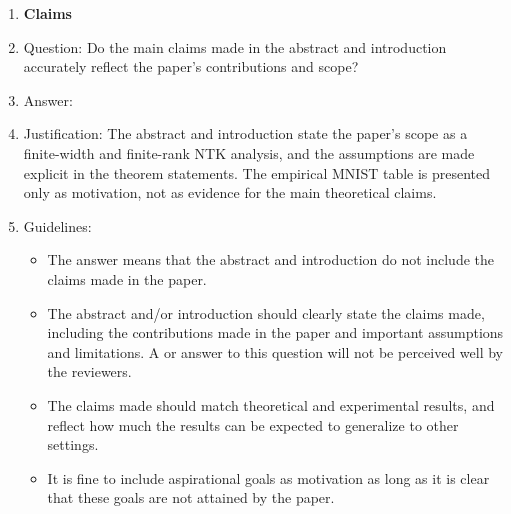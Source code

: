 \documentclass{article}
\begin{document}
\begin{enumerate}[leftmargin=1.5em]

\item {\bf Claims}
    \item[] Question: Do the main claims made in the abstract and introduction accurately reflect the paper's contributions and scope?
    \item[] Answer: \answerYes{}
    \item[] Justification: The abstract and introduction state the paper's scope as a finite-width and finite-rank NTK analysis, and the assumptions are made explicit in the theorem statements. The empirical MNIST table is presented only as motivation, not as evidence for the main theoretical claims.
    \item[] Guidelines:
    \begin{itemize}
        \item The answer \answerNA{} means that the abstract and introduction do not include the claims made in the paper.
        \item The abstract and/or introduction should clearly state the claims made, including the contributions made in the paper and important assumptions and limitations. A \answerNo{} or \answerNA{} answer to this question will not be perceived well by the reviewers.
        \item The claims made should match theoretical and experimental results, and reflect how much the results can be expected to generalize to other settings.
        \item It is fine to include aspirational goals as motivation as long as it is clear that these goals are not attained by the paper.
    \end{itemize}


\end{enumerate}
\end{document}
